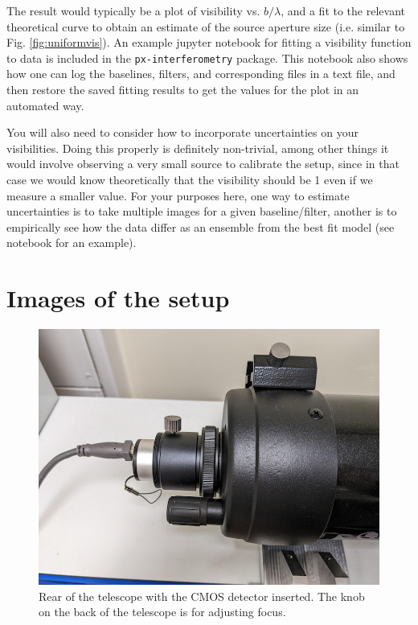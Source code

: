 \documentclass[11pt]{article}
\begin{document}
The result would typically be a plot of visibility vs. $b/\lambda$, and a fit to the relevant theoretical curve to obtain an estimate of the source aperture size (i.e. similar to Fig. \ref{fig:uniformvis}). An example jupyter notebook for fitting a visibility function to data is included in the \texttt{px-interferometry} package. This notebook also shows how one can log the baselines, filters, and corresponding files in a text file, and then restore the saved fitting results to get the values for the plot in an automated way.

You will also need to consider how to incorporate uncertainties on your visibilities. Doing this properly is definitely non-trivial, among other things it would involve observing a very small source to calibrate the setup, since in that case we would know theoretically that the visibility should be 1 even if we measure a smaller value. For your purposes here, one way to estimate uncertainties is to take multiple images for a given baseline/filter, another is to empirically see how the data differ as an ensemble from the best fit model (see notebook for an example).

\clearpage
\appendix

\section{Images of the setup}

\begin{figure}[h]
    \centering
    \includegraphics[width=1\textwidth]{doc/tel.png}
    \caption{Rear of the telescope with the CMOS detector inserted. The knob on the back of the telescope is for adjusting focus.}
    \label{fig:tel}
\end{figure}
\end{document}
